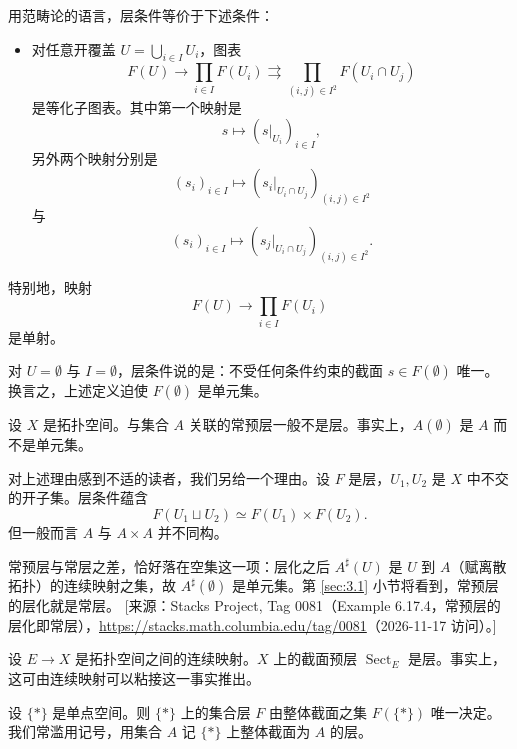 \begin{remark}\label{rem:1.2.2}
用范畴论的语言，层条件等价于下述条件：
\begin{itemize}
  \item 对任意开覆盖 $U=\bigcup_{i\in I}U_i$，图表
  \[
  F(U)\to\prod_{i\in I}F(U_i)\rightrightarrows\prod_{(i,j)\in I^2}F(U_i\cap U_j)
  \]
  是等化子图表。其中第一个映射是
  \[
  s\mapsto (s|_{U_i})_{i\in I},
  \]
  另外两个映射分别是
  \[
  (s_i)_{i\in I}\mapsto (s_i|_{U_i\cap U_j})_{(i,j)\in I^2}
  \]
  与
  \[
  (s_i)_{i\in I}\mapsto (s_j|_{U_i\cap U_j})_{(i,j)\in I^2}.
  \]
\end{itemize}
特别地，映射
\[
F(U)\to\prod_{i\in I}F(U_i)
\]
是单射。
\end{remark}

\begin{remark}\label{rem:1.2.3}
对 $U=\emptyset$ 与 $I=\emptyset$，层条件说的是：不受任何条件约束的截面 $s\in F(\emptyset)$ 唯一。换言之，上述定义迫使 $F(\emptyset)$ 是单元集。
\end{remark}

\begin{example}\label{ex:1.2.4}
设 $X$ 是拓扑空间。与集合 $A$ 关联的常预层一般不是层。事实上，$A(\emptyset)$ 是 $A$ 而不是单元集。

对上述理由感到不适的读者，我们另给一个理由。设 $F$ 是层，$U_1,U_2$ 是 $X$ 中不交的开子集。层条件蕴含
\[
F(U_1\sqcup U_2)\simeq F(U_1)\times F(U_2).
\]
但一般而言 $A$ 与 $A\times A$ 并不同构。
\end{example}

\begin{yizhu}
常预层与常层之差，恰好落在空集这一项：层化之后 $A^{\sharp}(U)$ 是 $U$ 到 $A$（赋离散拓扑）的连续映射之集，故 $A^{\sharp}(\emptyset)$ 是单元集。第 \ref{sec:3.1} 小节将看到，常预层的层化就是常层。
[来源：Stacks Project, Tag 0081（Example 6.17.4，常预层的层化即常层），\url{https://stacks.math.columbia.edu/tag/0081}（2026-11-17 访问）。]
\end{yizhu}

\begin{example}\label{ex:1.2.5}
设 $E\to X$ 是拓扑空间之间的连续映射。$X$ 上的截面预层 $\operatorname{Sect}_E$ 是层。事实上，这可由连续映射可以粘接这一事实推出。
\end{example}

\begin{example}\label{ex:1.2.6}
设 $\{*\}$ 是单点空间。则 $\{*\}$ 上的集合层 $F$ 由整体截面之集 $F(\{*\})$ 唯一决定。我们常滥用记号，用集合 $A$ 记 $\{*\}$ 上整体截面为 $A$ 的层。
\end{example}

